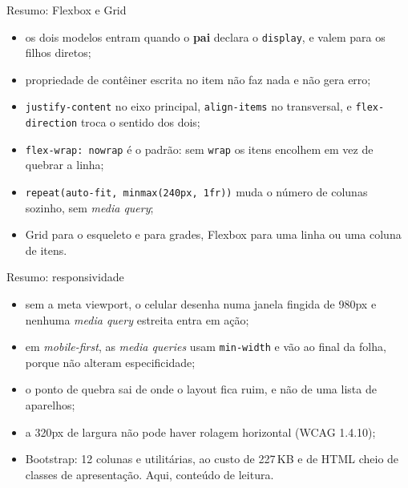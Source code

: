 \documentclass{beamer}
\begin{document}
\begin{frame}{Resumo: Flexbox e Grid}
	\begin{itemize}
		\item os dois modelos entram quando o \textbf{pai} declara o
		      \texttt{display}, e valem para os filhos diretos;
		\item propriedade de contêiner escrita no item não faz nada e não gera erro;
		\item \texttt{justify-content} no eixo principal, \texttt{align-items} no
		      transversal, e \texttt{flex-direction} troca o sentido dos dois;
		\item \texttt{flex-wrap: nowrap} é o padrão: sem \texttt{wrap} os itens
		      encolhem em vez de quebrar a linha;
		\item \texttt{repeat(auto-fit, minmax(240px, 1fr))} muda o número de colunas
		      sozinho, sem \emph{media query};
		\item Grid para o esqueleto e para grades, Flexbox para uma linha ou uma
		      coluna de itens.
	\end{itemize}
\end{frame}

\begin{frame}{Resumo: responsividade}
	\begin{itemize}
		\item sem a meta viewport, o celular desenha numa janela fingida de 980px e
		      nenhuma \emph{media query} estreita entra em ação;
		\item em \emph{mobile-first}, as \emph{media queries} usam
		      \texttt{min-width} e vão ao final da folha, porque não alteram
		      especificidade;
		\item o ponto de quebra sai de onde o layout fica ruim, e não de uma lista
		      de aparelhos;
		\item a 320px de largura não pode haver rolagem horizontal (WCAG 1.4.10);
		\item Bootstrap: 12 colunas e utilitárias, ao custo de 227\,KB e de HTML
		      cheio de classes de apresentação. Aqui, conteúdo de leitura.
	\end{itemize}
\end{frame}
\end{document}
